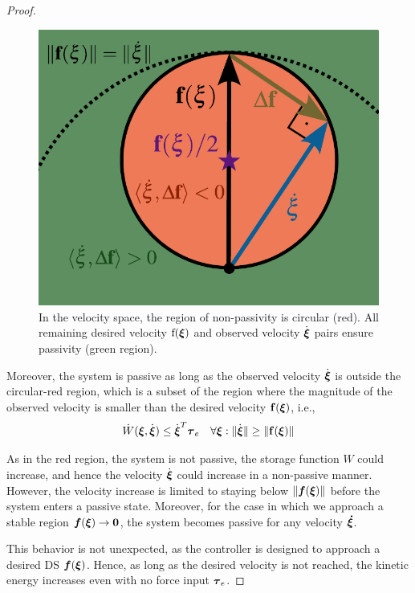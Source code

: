 \begin{proof}
\begin{figure}[b]
	\centering
	\includegraphics[width=0.5\columnwidth]{figures/passivity_analysis}
	\caption{In the velocity space, the region of non-passivity is circular (red). All remaining desired velocity $\mathrm f(\mathrm{{\boldsymbol{\xi}}})$ and observed velocity $\dot{\mathrm {\boldsymbol{\xi}}}$ pairs ensure passivity (green region).}
	\label{fig:passivity_analysis}
\end{figure}

Moreover, the system is passive as long as the observed velocity $\dot{{\boldsymbol{\xi}}}$ is outside the circular-red region, which is a subset of the region where the magnitude of the observed velocity is smaller than the desired velocity $\mathbf{f}({\boldsymbol{\xi}})$, i.e.,
\begin{equation}
	\dot W({\boldsymbol{\xi}}, \dot{{\boldsymbol{\xi}}}) \leq \dot{{\boldsymbol{\xi}}}^T \boldsymbol{\tau}_e
 \quad \forall {\boldsymbol{\xi}} : \| \dot{{\boldsymbol{\xi}}} \| \geq\| \mathbf{f}({\boldsymbol{\xi}}) \| 
\end{equation}

As in the red region, the system is not passive, the storage function $W$ could increase, and hence the velocity $\dot {\boldsymbol{\xi}}$ could increase in a non-passive manner. However, the velocity increase is limited to staying below $\| \boldsymbol{f}({\boldsymbol{\xi}}) \|$ before the system enters a passive state. Moreover, for the case in which we approach a stable region $\boldsymbol{f}({\boldsymbol{\xi}}) \rightarrow \boldsymbol{0}$, the system becomes passive for any velocity $\boldsymbol{\boldsymbol{\dot \xi}}$.

This behavior is not unexpected, as the controller is designed to approach a desired DS $\boldsymbol{f}({\boldsymbol{\xi}})$. Hence, as long as the desired velocity is not reached, the kinetic energy increases even with no force input $\boldsymbol{\tau}_e$.


\end{proof}
